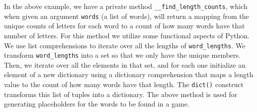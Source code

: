 In the above example, we have a private method \texttt{\_\_find\_length\_counts}, which when given an argument \texttt{words} (a list of words), will return a mapping from the unique counts of letters for each word to a count of how many words have that number of letters. For this method we utilize some functional aspects of Python. We use list comprehensions to iterate over all the lengths of \texttt{word\_lengths}. We transform \texttt{word\_lengths} into a set so that we only have the unique members. Then, we iterate over all the elements in that set, and for each one initialize an element of a new dictionary using a dictionary comprehension that maps a length value to the count of how many words have that length. The \texttt{dict()} construct transforms this list of tuples into a dictionary. The above method is used for generating placeholders for the words to be found in a game.

